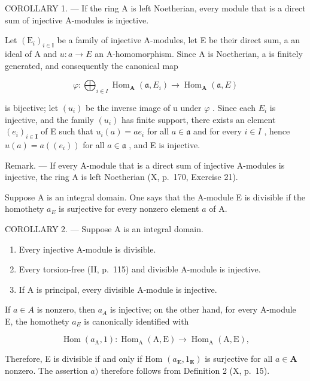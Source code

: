 COROLLARY 1. --- If the ring A is left Noetherian, every module that is a direct sum of injective A-modules is injective.

Let \((\mathrm{E}_{i})_{i\in\mathbb{I}}\) be a family of injective A-modules, let E be their direct sum, a an ideal of A and \(u:a\to E\) an A-homomorphism. Since A is Noetherian, a is finitely generated, and consequently the canonical map

\[
\varphi : \bigoplus_ {i \in I} \operatorname{Hom} _ {\mathbf {A}} (\mathfrak {a}, E _ {i}) \rightarrow \operatorname{Hom} _ {\mathbf {A}} (\mathfrak {a}, E)
\]

is bijective; let \((u_{i})\) be the inverse image of u under \(\varphi\) . Since each \(E_{i}\) is injective, and the family \((u_{i})\) has finite support, there exists an element \((e_{i})_{i\in\mathbf{I}}\) of E such that \(u_{i}(a)=ae_{i}\) for all \(a\in\mathfrak{a}\) and for every \(i\in I\) , hence \(u(a)=a((e_{i}))\) for all \(a\in\mathfrak{a}\) , and E is injective.

Remark. --- If every A-module that is a direct sum of injective A-modules is injective, the ring A is left Noetherian (X, p.~170, Exercise 21).

Suppose A is an integral domain. One says that the A-module E is divisible if the homothety \(a_{E}\) is surjective for every nonzero element \(a\) of A.

COROLLARY 2. --- Suppose A is an integral domain.

\begin{enumerate}
\def\labelenumi{\alph{enumi})}
\item
  Every injective A-module is divisible.
\item
  Every torsion-free (II, p.~115) and divisible A-module is injective.
\item
  If A is principal, every divisible A-module is injective.
\end{enumerate}

If \(a \in A\) is nonzero, then \(a_{A}\) is injective; on the other hand, for every A-module E, the homothety \(a_{E}\) is canonically identified with

\[
\operatorname{Hom} \left(a _ {\mathrm{A}}, 1\right): \operatorname{Hom} _ {\mathrm{A}} (\mathrm{A}, \mathrm{E}) \rightarrow \operatorname{Hom} _ {\mathrm{A}} (\mathrm{A}, \mathrm{E}),
\]

Therefore, E is divisible if and only if Hom \((a_{\mathbf{E}}, 1_{\mathbf{E}})\) is surjective for all \(a \in \mathbf{A}\) nonzero. The assertion \(a)\) therefore follows from Definition 2 (X, p.~15).

